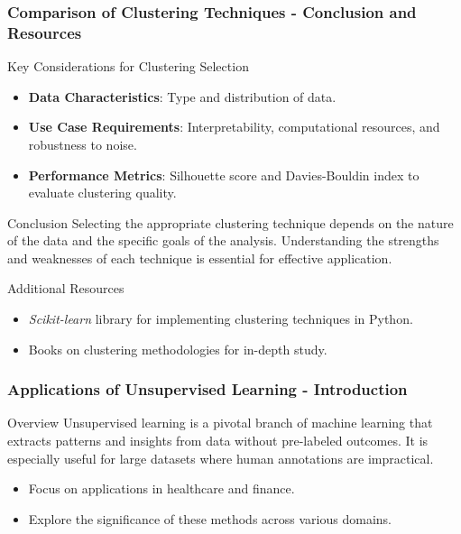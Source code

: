 \documentclass[aspectratio=169]{beamer}
\begin{document}
\begin{frame}[fragile]
    \frametitle{Comparison of Clustering Techniques - Conclusion and Resources}
    \begin{block}{Key Considerations for Clustering Selection}
        \begin{itemize}
            \item \textbf{Data Characteristics}: Type and distribution of data.
            \item \textbf{Use Case Requirements}: Interpretability, computational resources, and robustness to noise.
            \item \textbf{Performance Metrics}: Silhouette score and Davies-Bouldin index to evaluate clustering quality.
        \end{itemize}
    \end{block}

    \begin{block}{Conclusion}
        Selecting the appropriate clustering technique depends on the nature of the data and the specific goals of the analysis. 
        Understanding the strengths and weaknesses of each technique is essential for effective application.
    \end{block}

    \begin{block}{Additional Resources}
        \begin{itemize}
            \item \textit{Scikit-learn} library for implementing clustering techniques in Python.
            \item Books on clustering methodologies for in-depth study.
        \end{itemize}
    \end{block}
\end{frame}

\begin{frame}[fragile]
    \frametitle{Applications of Unsupervised Learning - Introduction}
    \begin{block}{Overview}
        Unsupervised learning is a pivotal branch of machine learning that extracts patterns and insights from data without pre-labeled outcomes. 
        It is especially useful for large datasets where human annotations are impractical.
    \end{block}
    
    \begin{itemize}
        \item Focus on applications in healthcare and finance.
        \item Explore the significance of these methods across various domains.
    \end{itemize}
\end{frame}
\end{document}
